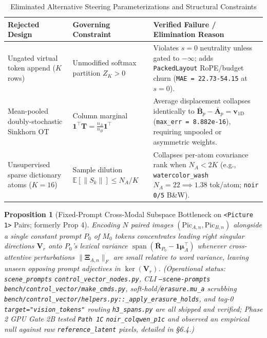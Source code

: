 \documentclass[10pt]{article}
\newtheorem{proposition}{Proposition}
\begin{document}
\begin{table}[htbp]
\centering
\caption{Eliminated Alternative Steering Parameterizations and Structural Constraints}
\scriptsize
\begin{tabularx}{\textwidth}{@{}XXX@{}}
\toprule
Rejected Design & Governing Constraint & Verified Failure / Elimination Reason \\
\midrule
Ungated virtual token append ($K$ rows) & Unmodified softmax partition $Z_K > 0$ & Violates $s = 0$ neutrality unless gated to $-\infty$; adds \texttt{PackedLayout} RoPE/budget churn (\texttt{MAE = 22.73-54.15} at $s=0$). \\
Mean-pooled doubly-stochastic Sinkhorn OT & Column marginal $\mathbf{1}^\top \mathbf{T} = \frac{n_A}{n_B}\mathbf{1}^\top$ & Average displacement collapses identically to $\bar{\mathbf{B}}_p - \bar{\mathbf{A}}_p = \mathbf{v}_{\text{1D}}$ (\texttt{max\_err = 8.882e-16}), requiring unpooled or asymmetric weights. \\
Unsupervised sparse dictionary atoms ($K=16$) & Sample dilution $\mathbb{E}[\|S_k\|] \le N_A / K$ & Collapses per-atom covariance rank when $N_A < 2K$ (e.g., \texttt{watercolor\_wash} $N_A = 22 \implies 1.38$ tok/atom; \texttt{noir} \texttt{0/5} B\&W). \\
\bottomrule
\end{tabularx}
\end{table}

\begin{proposition}[Fixed-Prompt Cross-Modal Subspace Bottleneck on \texttt{<Picture 1>} Pairs; formerly Prop 4]
Encoding $N$ paired images $(\text{Pic}_{A,n}, \text{Pic}_{B,n})$ alongside a single constant prompt $P_0$ of $M_0$ tokens concentrates leading right singular directions $\mathbf{V}_r$ onto $P_0$'s lexical variance $\operatorname{span}(\bar{\mathbf{R}}_{P_0} - \mathbf{1}\boldsymbol{\mu}_A^\top)$ whenever cross-attentive perturbations $\|\boldsymbol{\Xi}_{A,n}\|_F$ are small relative to word variance, leaving unseen opposing prompt adjectives in $\ker(\mathbf{V}_r)$. (Operational status: \texttt{scene\_prompts} \texttt{control\_vector\_nodes.py}, CLI \texttt{--scene-prompts} \texttt{bench/control\_vector/make\_cmds.py}, soft-hold/\texttt{erasure.mu\_a} scrubbing \texttt{bench/control\_vector/helpers.py::\_apply\_erasure\_holds}, and tag-0 \texttt{target="vision\_tokens"} routing \texttt{h3\_spans.py} are all shipped and verified; Phase 2 GPU Gate 2B tested \texttt{Path 1C} \texttt{noir\_colqwen\_p1c} and observed an empirical null against raw \texttt{reference\_latent} pixels, detailed in \S{}6.4.)
\end{proposition}
\end{document}
